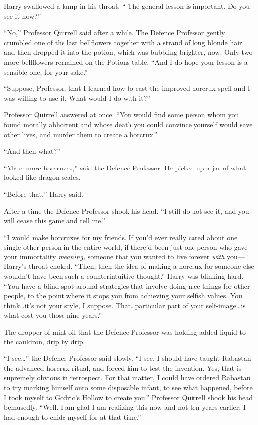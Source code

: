 Harry swallowed a lump in his throat. “ The general lesson is important. Do you
see it now?”

“No,” Professor Quirrell said after a while. The Defence Professor gently
crumbled one of the last bellflowers together with a strand of long blonde hair
and then dropped it into the potion, which was bubbling brighter, now. Only two
more bellflowers remained on the Potions table. “And I do hope your lesson is a
sensible one, for your sake.”

“Suppose, Professor, that I learned how to cast the improved horcrux spell and
I was willing to use it. What would I do with it?”

Professor Quirrell answered at once. “You would find some person whom you found
morally abhorrent and whose death you could convince yourself would save other
lives, and murder them to create a horcrux.”

“And then what?”

“Make more horcruxes,” said the Defence Professor. He picked up a jar of what
looked like dragon scales.

“Before that,” Harry said.

After a time the Defence Professor shook his head. “I still do not see it, and
you will cease this game and tell me.”

“I would make horcruxes for my friends. If you’d ever really cared about one
single other person in the entire world, if there’d been just one person who
gave your immortality \emph{meaning,} someone that you wanted to live forever
\emph{with} you—” Harry’s throat choked. “Then, then the idea of making a
horcrux for someone else wouldn’t have been such a counterintuitive thought.”
Harry was blinking hard. “You have a blind spot around strategies that involve
doing nice things for other people, to the point where it stops you from
achieving your selfish values. You think…it’s not your style, I
suppose. That…particular part of your self-image…is what cost
you those nine years.”

The dropper of mint oil that the Defence Professor was holding added liquid to
the cauldron, drip by drip.

“I see…” the Defence Professor said slowly. “I see. I should have taught
Rabastan the advanced horcrux ritual, and forced him to test the invention.
Yes, that is supremely obvious in retrospect. For that matter, I could have
ordered Rabastan to try marking himself onto some disposable infant, to see
what happened, before I took myself to Godric’s Hollow to create you.”
Professor Quirrell shook his head bemusedly. “Well. I am glad I am realizing
this now and not ten years earlier; I had enough to chide myself for at that
time.”

